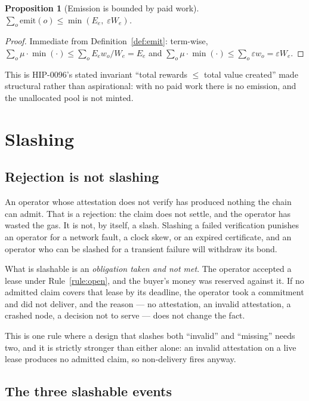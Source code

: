 \documentclass[11pt,a4paper]{article}
\newtheorem{proposition}[definition]{Proposition}
\newcommand{\emit}{\mathrm{emit}}
\begin{document}
\begin{proposition}[Emission is bounded by paid work]
$\sum_o \emit(o) \le \min(E_e,\; \varepsilon W_e)$.
\end{proposition}

\begin{proof}
Immediate from Definition~\ref{def:emit}: term-wise, $\sum_o \mu \cdot \min(\cdot)
\le \sum_o E_e w_o / W_e = E_e$ and $\sum_o \mu \cdot \min(\cdot) \le
\sum_o \varepsilon w_o = \varepsilon W_e$.
\end{proof}

This is HIP-0096's stated invariant ``total rewards $\le$ total value created''
made structural rather than aspirational: with no paid work there is no
emission, and the unallocated pool is not minted.

\section{Slashing}
\label{sec:slash}

\subsection{Rejection is not slashing}

An operator whose attestation does not verify has produced nothing the chain can
admit. That is a rejection: the claim does not settle, and the operator has
wasted the gas. It is not, by itself, a slash. Slashing a failed verification
punishes an operator for a network fault, a clock skew, or an expired
certificate, and an operator who can be slashed for a transient failure will
withdraw its bond.

What is slashable is an \emph{obligation taken and not met}. The operator
accepted a lease under Rule~\ref{rule:open}, and the buyer's money was reserved
against it. If no admitted claim covers that lease by its deadline, the operator
took a commitment and did not deliver, and the reason --- no attestation, an
invalid attestation, a crashed node, a decision not to serve --- does not change
the fact.

This is one rule where a design that slashes both ``invalid'' and ``missing''
needs two, and it is strictly stronger than either alone: an invalid attestation
on a live lease produces no admitted claim, so non-delivery fires anyway.

\subsection{The three slashable events}
\end{document}
